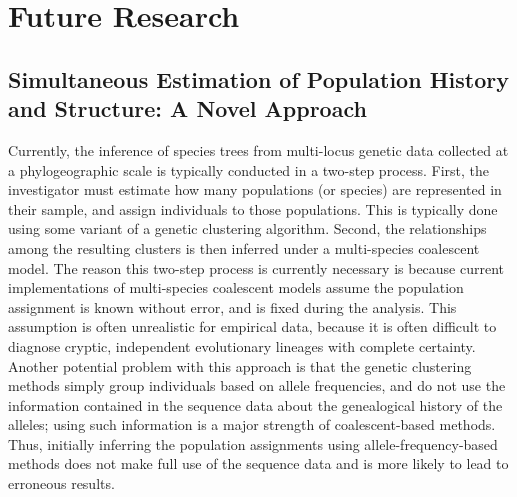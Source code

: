 \documentclass[10pt]{article}
\begin{document}
\section*{Future Research}
\subsection*{Simultaneous Estimation of Population History and Structure: A Novel Approach}
Currently, the inference of species trees from multi-locus genetic data collected at a phylogeographic scale is typically conducted in a two-step process.
First, the investigator must estimate how many populations (or species) are represented in their sample, and assign individuals to those populations.
This is typically done using some variant of a genetic clustering algorithm.
Second, the relationships among the resulting clusters is then inferred under a multi-species coalescent model.
The reason this two-step process is currently necessary is because current implementations of multi-species coalescent models assume the population assignment is known without error, and is fixed during the analysis.
This assumption is often unrealistic for empirical data, because it is often difficult to diagnose cryptic, independent evolutionary lineages with complete certainty.
Another potential problem with this approach is that the genetic clustering methods simply group individuals based on allele frequencies, and do not use the information contained in the sequence data about the genealogical history of the alleles; using such information is a major strength of coalescent-based methods.
Thus, initially inferring the population assignments using allele-frequency-based methods does not make full use of the sequence data and is more likely to lead to erroneous results.
\end{document}
